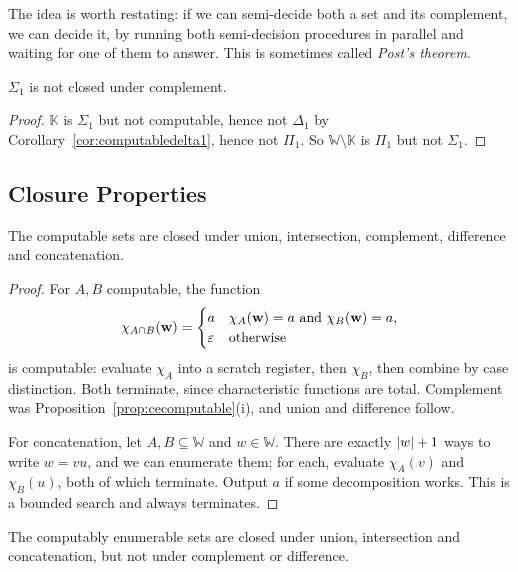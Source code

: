 \documentclass[a4paper]{scrartcl}
\newcommand{\WW}{\mathbb{W}}
\newcommand{\KK}{\mathbb{K}}
\newcommand{\eps}{\varepsilon}
\begin{document}
The idea is worth restating: if we can semi-decide both a set and its complement, we can decide it, by running both semi-decision procedures in parallel and waiting for one of them to answer. This is sometimes called \emph{Post's theorem}.

\begin{corollary}\label{cor:sigmanotcomplement}
	$\Sigma_1$ is not closed under complement.
\end{corollary}

\begin{proof}
	$\KK$ is $\Sigma_1$ but not computable, hence not $\Delta_1$ by Corollary~\ref{cor:computabledelta1}, hence not $\Pi_1$. So $\WW\setminus\KK$ is $\Pi_1$ but not $\Sigma_1$.
\end{proof}

\subsection{Closure Properties}

\begin{proposition}
	The computable sets are closed under union, intersection, complement, difference and concatenation.
\end{proposition}

\begin{proof}
	For $A, B$ computable, the function
	$$\chi_{A\cap B}(\vv w) = \begin{cases} a & \chi_A(\vv w) = a \text{ and } \chi_B(\vv w) = a, \\ \eps & \text{otherwise}\end{cases}$$
	is computable: evaluate $\chi_A$ into a scratch register, then $\chi_B$, then combine by case distinction. Both terminate, since characteristic functions are total. Complement was Proposition~\ref{prop:cecomputable}(i), and union and difference follow.

	For concatenation, let $A, B \subseteq \WW$ and $w \in \WW$. There are exactly $\lvert w\rvert+1$ ways to write $w = vu$, and we can enumerate them; for each, evaluate $\chi_A(v)$ and $\chi_B(u)$, both of which terminate. Output $a$ if some decomposition works. This is a bounded search and always terminates.
\end{proof}

\begin{proposition}\label{prop:ceclosure}
	The computably enumerable sets are closed under union, intersection and concatenation, but not under complement or difference.
\end{proposition}
\end{document}

